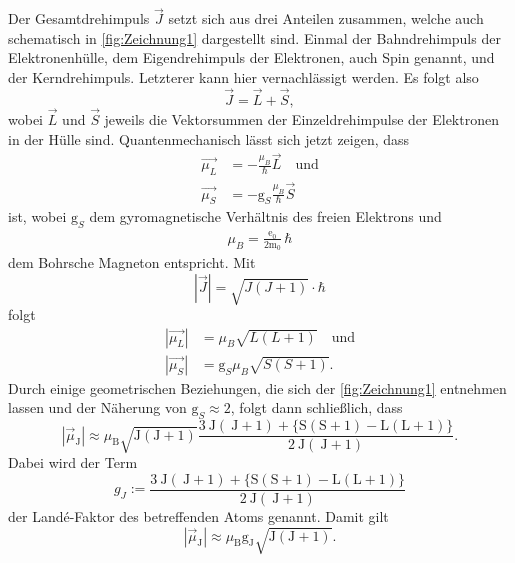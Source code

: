 Der Gesamtdrehimpuls $\vec{J}$ setzt sich aus drei Anteilen zusammen, welche auch schematisch in \autoref{fig:Zeichnung1} dargestellt sind.
Einmal der Bahndrehimpuls der Elektronenhülle, dem Eigendrehimpuls der Elektronen, auch Spin genannt, und der Kerndrehimpuls.
Letzterer kann hier vernachlässigt werden.
Es folgt also
\begin{equation*}
    \vec{J} = \vec{L} + \vec{S},
\end{equation*}
wobei $\vec{L}$ und $\vec{S}$ jeweils die Vektorsummen der Einzeldrehimpulse der Elektronen in der Hülle sind.
Quantenmechanisch lässt sich jetzt zeigen, dass
\begin{align*}
    \vec{\mu_L} &= - \frac{\mu_B}{\hbar} \vec{L} \quad \text{und} \\
    \vec{\mu_S} &= - \text{g}_S \frac{\mu_B}{\hbar} \vec{S}
\end{align*}
ist, wobei $\text{g}_S$ dem gyromagnetische Verhältnis des freien Elektrons und 
\begin{align*}
    \mu_B = \frac{\text{e}_0}{2\text{m}_0} \, \hbar
\end{align*}
dem Bohrsche Magneton entspricht.
Mit
\begin{equation*}
    \left| \vec{J}\right| = \sqrt{J \left( J + 1 \right)} \cdot \hbar
\end{equation*}
folgt 
\begin{align*}
    \left|\vec{\mu_L} \right| &= \mu_B \sqrt{L \left( L + 1 \right)} \quad \text{und} \\
    \left|\vec{\mu_S} \right| &= \text{g}_S \mu_B \sqrt{S \left( S + 1 \right)}.
\end{align*}
Durch einige geometrischen Beziehungen, die sich der \autoref{fig:Zeichnung1} entnehmen lassen und der Näherung von $\text{g}_S \approx 2$, folgt dann schließlich, dass
\begin{equation*}
    \left|\vec{\mu}_{\mathrm{J}}\right| \approx \mu_{\mathrm{B}} \sqrt{\mathrm{J}(\mathrm{J}+1)} \frac{3 \mathrm{~J}(\mathrm{~J}+1)+\{\mathrm{S}(\mathrm{S}+1)-\mathrm{L}(\mathrm{L}+1)\}}{2 \mathrm{~J}(\mathrm{~J}+1)} .
\end{equation*}
Dabei wird der Term
\begin{equation}
    g_{J}:=\frac{3 \mathrm{~J}(\mathrm{~J}+1)+\{\mathrm{S}(\mathrm{S}+1)-\mathrm{L}(\mathrm{L}+1)\}}{2 \mathrm{~J}(\mathrm{~J}+1)}
\end{equation}
der Landé-Faktor des betreffenden Atoms genannt. Damit gilt
\begin{equation}\label{eq:lande}
    \left|\vec{\mu}_{\mathrm{J}}\right| \approx \mu_{\mathrm{B}} \mathrm{g}_{\mathrm{J}} \sqrt{\mathrm{J}(\mathrm{J}+1)}.
\end{equation}
